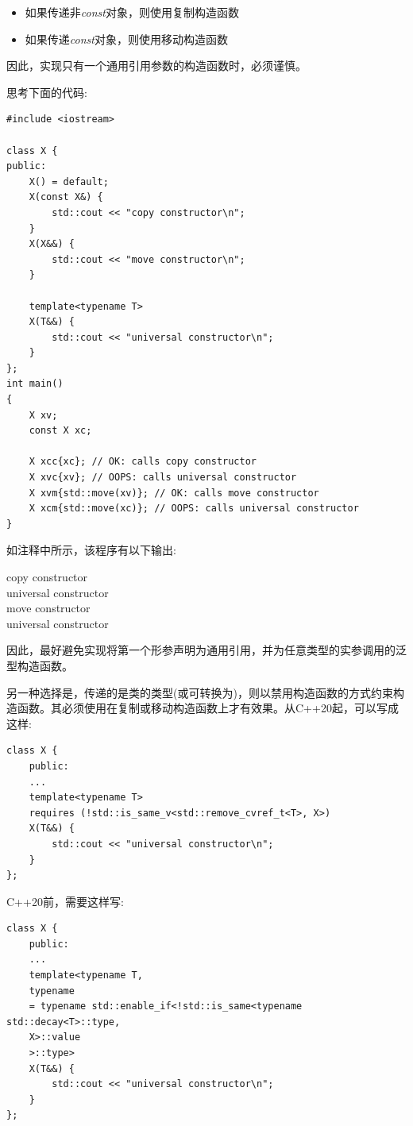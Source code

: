 \begin{itemize}
	\item 如果传递非\textit{const}对象，则使用复制构造函数
	\item 如果传递\textit{const}对象，则使用移动构造函数
\end{itemize}

因此，实现只有一个通用引用参数的构造函数时，必须谨慎。\par

思考下面的代码:\par

{\color{red}{generic/universalconstructor.cpp}}\par

\begin{lstlisting}[caption={}]
#include <iostream>

class X {
public:
	X() = default;
	X(const X&) {
		std::cout << "copy constructor\n";
	}
	X(X&&) {
		std::cout << "move constructor\n";
	}

	template<typename T>
	X(T&&) {
		std::cout << "universal constructor\n";
	}
};
int main()
{
	X xv;
	const X xc;
	
	X xcc{xc}; // OK: calls copy constructor
	X xvc{xv}; // OOPS: calls universal constructor
	X xvm{std::move(xv)}; // OK: calls move constructor
	X xcm{std::move(xc)}; // OOPS: calls universal constructor
}
\end{lstlisting}

如注释中所示，该程序有以下输出:\par

\begin{tcolorbox}[colback=white,colframe=black]
copy constructor \\
universal constructor \\
move constructor \\
universal constructor
\end{tcolorbox}

因此，最好避免实现将第一个形参声明为通用引用，并为任意类型的实参调用的泛型构造函数。\par

另一种选择是，传递的是类的类型(或可转换为)，则以禁用构造函数的方式约束构造函数。其必须使用在复制或移动构造函数上才有效果。从C++20起，可以写成这样:\par

\begin{lstlisting}[caption={}]
class X {
	public:
	...
	template<typename T>
	requires (!std::is_same_v<std::remove_cvref_t<T>, X>)
	X(T&&) {
		std::cout << "universal constructor\n";
	}
};
\end{lstlisting}

C++20前，需要这样写:\par

\begin{lstlisting}[caption={}]
class X {
	public:
	...
	template<typename T,
	typename
	= typename std::enable_if<!std::is_same<typename std::decay<T>::type,
	X>::value
	>::type>
	X(T&&) {
		std::cout << "universal constructor\n";
	}
};
\end{lstlisting}


















